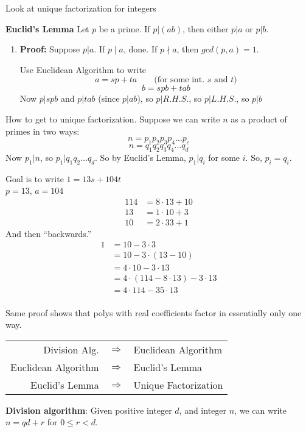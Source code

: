 Look at unique factorization for integers

\textbf{Euclid's Lemma} Let $p$ be a prime. If $p|(ab)$, then either $p|a$ or $p|b$.

\begin{enumerate}
\item[]
\textbf{Proof:} Suppose $p|a$. If $p\mid a$, done. If $p\nmid a$, then $gcd(p,a) = 1$.

Use Euclidean Algorithm to write
\[ a = sp + ta \qquad\mbox{(for some int. $s$ and $t$)}
\]\[
b = spb + tab
\]
Now $p|spb$ and $p|tab$ (since $p|ab$), so $p|R.H.S.$, so $p|L.H.S.$, so $p|b$
\end{enumerate}

How to get to unique factorization. Suppose we can write $n$ as a product of primes in two ways:
\[
n = p_1p_2p_3p_4\ldots p_c
\]\[
n = q_1q_2q_3q_4\ldots q_d
\]
Now $p_1|n$, so $p_1|q_1q_2\ldots q_d$. So by Euclid's Lemma, $p_1|q_i$ for some $i$. So, $p_i=q_i$.

Goal is to write $1 = 13s + 104t$\\
$p = 13$, $a = 104$
\begin{align*}
114 &= 8 \cdot 13 + 10 \\
13 &= 1 \cdot 10 + 3 \\
10 &= 2 \cdot 33 + 1 
\end{align*}
And then ``backwards.''
\begin{align*}
1 & =  10 - 3 \cdot 3 \\ 
 & =  10 - 3 \cdot (13-10) \\ 
 & =  4 \cdot 10 - 3 \cdot 13 \\ 
 & =  4 \cdot (114 - 8 \cdot 13) - 3 \cdot 13 \\ 
 & =  4 \cdot 114 - 35 \cdot 13 \\ 
\end{align*}

Same proof shows that polys with real coefficients factor in essentially only one way.

\begin{tabular}{rcl}
Division Alg. & $\Rightarrow$ & Euclidean Algorithm \\
Euclidean Algorithm & $\Rightarrow$ & Euclid's Lemma \\
Euclid's Lemma & $\Rightarrow$ & Unique Factorization \\
\end{tabular}

\textbf{Division algorithm}: Given positive integer $d$, and integer $n$, we can write $n = qd + r$ for $0 \leq r < d$.

